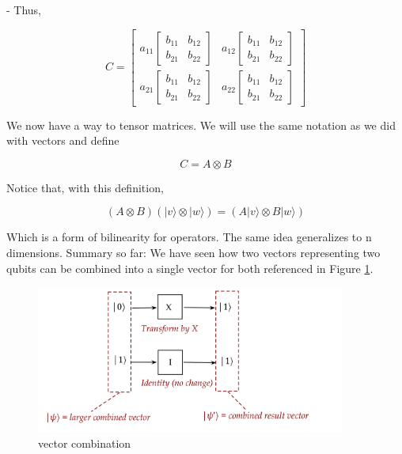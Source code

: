\documentclass[main.tex]{subfiles}
\begin{document}
    - Thus,
    
    $$
    C=\left[\begin{array}{ll}
    a_{11}\left[\begin{array}{ll}
    b_{11} & b_{12} \\
    b_{21} & b_{22}
    \end{array}\right] & a_{12}\left[\begin{array}{ll}
    b_{11} & b_{12} \\
    b_{21} & b_{22}
    \end{array}\right] \\
    a_{21}\left[\begin{array}{ll}
    b_{11} & b_{12} \\
    b_{21} & b_{22}
    \end{array}\right] & a_{22}\left[\begin{array}{ll}
    b_{11} & b_{12} \\
    b_{21} & b_{22}
    \end{array}\right]
    \end{array}\right]
    $$
    
    We now have a way to tensor matrices. We will use the same notation as we did with vectors and define
    
    $$
    C=A \otimes B
    $$
    
    Notice that, with this definition,
    
    $$
    (A \otimes B)(|v\rangle \otimes|w\rangle)=(A|v\rangle \otimes B|w\rangle)
    $$
    
    Which is a form of bilinearity for operators. The same idea generalizes to $\mathrm{n}$ dimensions. Summary so far: We have seen how two vectors representing two qubits can be combined into a single vector for both referenced in Figure \ref{fig:06tensor1}.
    
    \begin{figure}
        \centering
        \includegraphics[width=4in]{notes/figs/n06/06tensor1.png}
        \caption{vector combination}
        \label{fig:06tensor1}
    \end{figure} 
    
\end{document}
